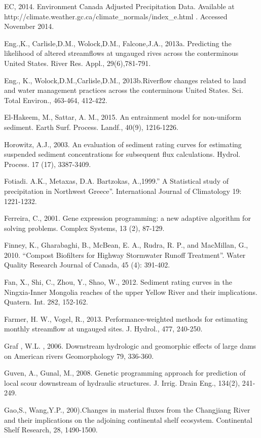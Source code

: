 \begin{hangingpar}{2em}
EC, 2014. Environment Canada Adjusted Precipitation Data. Available at \\http://climate.weather.gc.ca/climate\_normals/index\_e.html . Accessed November 2014.

Eng.,K., Carlisle,D.M., Wolock,D.M., Falcone,J.A., 2013a. Predicting the likelihood of altered streamflows at ungauged rives across the conterminous United States. River Res. Appl.,  29(6),781-791.

Eng., K., Wolock,D.M.,Carlisle,D.M., 2013b.Riverflow changes related to land and water management practices across the conterminous United States. Sci. Total Environ., 463-464, 412-422.

El-Hakeem, M., Sattar, A. M., 2015. An entrainment model for non-uniform sediment. Earth Surf. Process. Landf., 40(9), 1216-1226.

Horowitz, A.J., 2003. An evaluation of sediment rating curves for estimating suspended sediment concentrations for subsequent flux calculations. Hydrol. Process. 17 (17), 3387-3409.

Fotiadi. A.K., Metaxas, D.A. Bartzokas, A.,1999.'' A Statistical study of precipitation in Northwest Greece''. International Journal of Climatology 19: 1221-1232. 

Ferreira, C., 2001. Gene expression programming: a new adaptive algorithm for solving problems. Complex Systems, 13 (2), 87-129.

Finney, K., Gharabaghi, B., McBean, E. A., Rudra, R. P., and MacMillan, G., 2010. ``Compost Biofilters for Highway Stormwater Runoff Treatment''.   Water Quality Research Journal of Canada, 45 (4): 391-402.

Fan, X., Shi, C., Zhou, Y., Shao, W., 2012. Sediment rating curves in the Ningxia-Inner Mongolia reaches of the upper Yellow River and their implications. Quatern. Int. 282, 152-162.

Farmer, H. W., Vogel, R., 2013.  Performance-weighted methods for estimating monthly streamflow at ungauged sites. J. Hydrol., 477, 240-250.

Graf , W.L. , 2006. Downstream hydrologic and geomorphic effects of large dams on American rivers Geomorphology 79, 336-360.

Guven, A., Gunal, M., 2008. Genetic programming approach for prediction of local scour downstream of hydraulic structures. J. Irrig. Drain Eng., 134(2), 241-249.

Gao,S., Wang,Y.P., 200).Changes in material fluxes from the Changjiang River and their implications on the adjoining continental shelf ecosystem. Continental Shelf Research, 28, 1490-1500.


\end{hangingpar}
